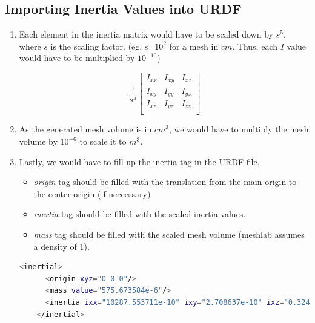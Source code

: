 \documentclass[11pt]{article}
\begin{document}
\subsection{Importing Inertia Values into URDF}
\begin{enumerate}
 \item {
       
       Each element in the inertia matrix would have to be scaled down by $s^5$, where $s$ is the scaling factor.
       (eg. s=$10^2$ for a mesh in $cm$. Thus, each $I$ value would have to be multiplied by $10^{-10}$)
       
       $$
        \frac{1}{s^5}
        \begin{bmatrix}
         I_{xx} & I_{xy} & I_{xz} \\
         I_{xy} & I_{yy} & I_{yz} \\
         I_{xz} & I_{yz} & I_{zz} \\
        \end{bmatrix}
       $$
       }
 \item{
       As the generated mesh volume is in ${cm}^3$, we would have to multiply the mesh volume by $10^{-6}$ to scale it to $m^3$.
       }
 \item{
       Lastly, we would have to fill up the inertia tag in the URDF file.
       \begin{itemize}
        \item { \emph{origin} tag should be filled with the translation from the main origin to the center origin (if neccessary)}
        \item { \emph{inertia} tag should be filled with the scaled inertia values. }
        \item { \emph{mass} tag should be filled with the scaled mesh volume (meshlab assumes a density of 1).}
       \end{itemize}
       \begin{lstlisting}[language=bash]
    <inertial>
      <origin xyz="0 0 0"/>
      <mass value="575.673584e-6"/>
      <inertia ixx="10287.553711e-10" ixy="2.708637e-10" ixz="0.324480e-10" iyy="6752.031738e-10" iyz="-0.408100e-10" izz="6754.208984e-10"/>
    </inertial>

       \end{lstlisting}
       
       
       }
\end{enumerate}
\end{document}
